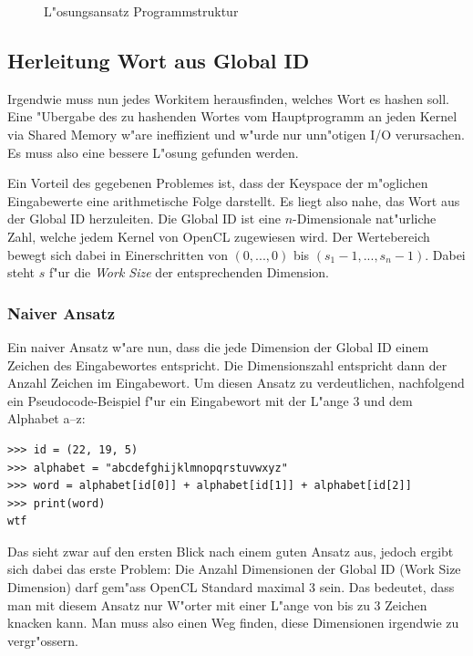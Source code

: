 \begin{refsection}
\begin{figure}[H]
	\centering
	
	\caption{L"osungsansatz Programmstruktur}
	\label{img:crypto:programm-struktur}
\end{figure}

\subsection{Herleitung Wort aus Global ID}

Irgendwie muss nun jedes Workitem herausfinden, welches Wort es hashen soll. Eine
"Ubergabe des zu hashenden Wortes vom Hauptprogramm an jeden Kernel via Shared
Memory w"are ineffizient und w"urde nur unn"otigen I/O verursachen. Es muss also
eine bessere L"osung gefunden werden.

Ein Vorteil des gegebenen Problemes ist, dass der Keyspace der m"oglichen
Eingabewerte eine arithmetische Folge darstellt. Es liegt also nahe, das Wort
aus der Global ID herzuleiten. Die Global ID ist eine $n$-Dimensionale
nat"urliche Zahl, welche jedem Kernel von OpenCL zugewiesen wird. Der
Wertebereich bewegt sich dabei in Einerschritten von $(0, ..., 0)$ bis $(s_1-1,
..., s_n-1)$. Dabei steht $s$ f"ur die \textit{Work Size} der entsprechenden
Dimension.

\subsubsection{Naiver Ansatz}

Ein naiver Ansatz w"are nun, dass die jede Dimension der Global ID einem Zeichen
des Eingabewortes entspricht. Die Dimensionszahl entspricht dann der Anzahl
Zeichen im Eingabewort. Um diesen Ansatz zu verdeutlichen, nachfolgend ein
Pseudocode-Beispiel f"ur ein Eingabewort mit der L"ange 3 und dem Alphabet a--z:

\begin{small}
\begin{verbatim}
>>> id = (22, 19, 5)
>>> alphabet = "abcdefghijklmnopqrstuvwxyz"
>>> word = alphabet[id[0]] + alphabet[id[1]] + alphabet[id[2]]
>>> print(word)
wtf
\end{verbatim}
\end{small}

\noindent Das sieht zwar auf den ersten Blick nach einem guten Ansatz aus,
jedoch ergibt sich dabei das erste Problem: Die Anzahl Dimensionen der Global ID
(Work Size Dimension) darf gem"ass OpenCL Standard\cite{crypto:opencl_ref}
maximal 3 sein. Das bedeutet, dass man mit diesem Ansatz nur W"orter mit einer
L"ange von bis zu 3 Zeichen knacken kann. Man muss also einen Weg finden, diese
Dimensionen irgendwie zu vergr"ossern.


\end{refsection}
